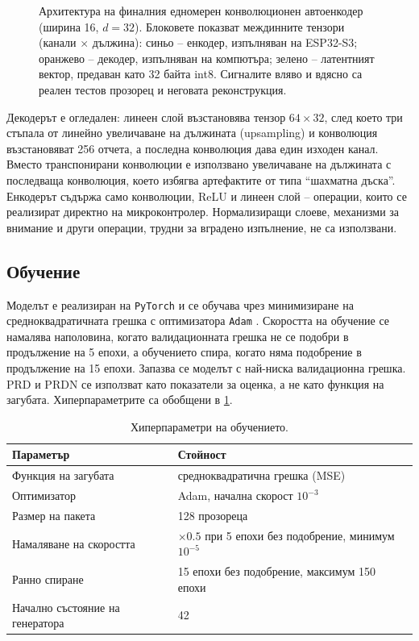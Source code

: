 \documentclass[12pt,a4paper]{article}
\begin{document}
\begin{figure}[htbp]
    \centering
    \resizebox{\textwidth}{!}{}
    \caption{Архитектура на финалния едномерен конволюционен автоенкодер (ширина 16, \(d = 32\)). Блоковете показват междинните тензори (канали \(\times\) дължина): синьо -- енкодер, изпълняван на ESP32-S3; оранжево -- декодер, изпълняван на компютъра; зелено -- латентният вектор, предаван като 32 байта int8. Сигналите вляво и вдясно са реален тестов прозорец и неговата реконструкция.}
    \label{fig:cae}
\end{figure}

Декодерът е огледален: линеен слой възстановява тензор \(64 \times 32\), след което три стъпала от линейно увеличаване на дължината (upsampling) и конволюция възстановяват 256 отчета, а последна конволюция дава един изходен канал. Вместо транспонирани конволюции е използвано увеличаване на дължината с последваща конволюция, което избягва артефактите от типа \enquote{шахматна дъска}. Енкодерът съдържа само конволюции, ReLU и линеен слой -- операции, които се реализират директно на микроконтролер. Нормализиращи слоеве, механизми за внимание и други операции, трудни за вградено изпълнение, не са използвани.

\subsection{Обучение}
Моделът е реализиран на \texttt{PyTorch} \cite{paszke2019pytorch} и се обучава чрез минимизиране на средноквадратичната грешка с оптимизатора \texttt{Adam} \cite{kingma2015adam}. Скоростта на обучение се намалява наполовина, когато валидационната грешка не се подобри в продължение на 5 епохи, а обучението спира, когато няма подобрение в продължение на 15 епохи. Запазва се моделът с най-ниска валидационна грешка. PRD и PRDN се използват като показатели за оценка, а не като функция на загубата. Хиперпараметрите са обобщени в \cref{tab:hyper}.

\begin{table}[htbp]
    \centering
    \begin{tabular}{l l}
        \toprule
        Параметър & Стойност \\
        \midrule
        Функция на загубата & средноквадратична грешка (MSE) \\
        Оптимизатор & Adam, начална скорост \(10^{-3}\) \\
        Размер на пакета & 128 прозореца \\
        Намаляване на скоростта & \(\times 0.5\) при 5 епохи без подобрение, минимум \(10^{-5}\) \\
        Ранно спиране & 15 епохи без подобрение, максимум 150 епохи \\
        Начално състояние на генератора & 42 \\
        \bottomrule
    \end{tabular}
    \caption{Хиперпараметри на обучението.}
    \label{tab:hyper}
\end{table}
\end{document}
